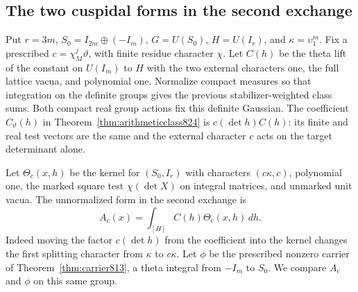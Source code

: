\documentclass[a4paper,11pt]{article}
\theoremstyle{definition}
\theoremstyle{remark}
\numberwithin{equation}{section}
\begin{document}
\subsection{The two cuspidal forms in the second exchange}
\label{sec:secondcarrier829}
Put \(r=3m\), \(S_0=I_{2m}\oplus(-I_m)\),
\(G=U(S_0)\), \(H=U(I_r)\), and \(\kappa=\upsilon_1^m\).
Fix a prescribed \(c=\chi_M^j\vartheta\), with finite
residue character \(\chi\). Let \(C(h)\) be the theta lift
of the constant on \(U(I_m)\) to \(H\) with the two external
characters one, the full lattice vacua, and polynomial one.
Normalize compact measures so that integration on the
definite groups gives the previous stabilizer-weighted
class sums. Both compact real group actions fix this definite
Gaussian. The coefficient \(C_\vartheta(h)\) in
Theorem~\ref{thm:arithmeticclass824} is
\(c(\det h)C(h)\): its finite and real test vectors are the
same and the external character \(c\) acts on the target
determinant alone.

Let \(\Theta_c(x,h)\) be the kernel for \((S_0,I_r)\) with
characters \((c\kappa,c)\), polynomial one, the marked square
test \(\chi(\det X)\) on integral matrices, and unmarked unit
vacua. The unnormalized form in the second exchange is
\[
                   A_c(x)=\int_{[H]} C(h)\Theta_c(x,h)\,dh .
\]
Indeed moving the factor \(c(\det h)\) from the coefficient
into the kernel changes the first splitting character from
\(\kappa\) to \(c\kappa\). Let \(\phi\) be the prescribed
nonzero carrier of Theorem~\ref{thm:carrier813}, a theta
integral from \(-I_m\) to \(S_0\). We compare \(A_c\) and
\(\phi\) on this same group.
\end{document}
